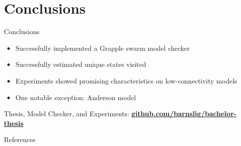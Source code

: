\documentclass[aspectratio=169]{beamer}
\begin{document}
\section{Conclusions}

\begin{frame}{Conclusions}
    \begin{itemize}
        \item Successfully implemented a Grapple swarm model checker
        \item Successfully estimated unique states visited
        \item Experiments showed promising characteristics on low-connectivity models
        \item One notable exception: Anderson model
    \end{itemize}

    \bigskip

    Thesis, Model Checker, and Experiments: \textbf{\href{https://github.com/barnslig/bachelor-thesis}{github.com/barnslig/bachelor-thesis}}
\end{frame}

\appendix

\begin{frame}{References} %
    \printbibliography[heading=none]
\end{frame}
\end{document}
